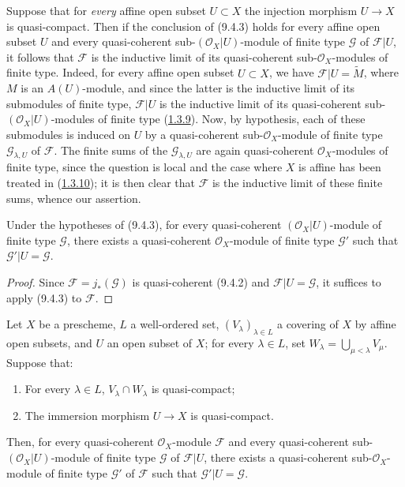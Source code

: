 \begin{remark}[9.4.4]
\label{I.9.4.4}
Suppose that for \emph{every} affine open subset $U\subset X$ the injection
morphism $U\to X$ is quasi-compact. Then if the conclusion of (9.4.3)
holds for every affine open subset $U$ and every quasi-coherent
sub-$(\mathscr{O}_X|U)$-module of finite type $\mathscr{G}$ of
$\mathscr{F}|U$,
it follows that $\mathscr{F}$ is the inductive limit of its quasi-coherent
sub-$\mathscr{O}_X$-modules of finite type. Indeed, for every affine open
subset $U\subset X$, we have $\mathscr{F}|U=\widetilde{M}$, where $M$ is an
$A(U)$-module, and since the latter is the inductive limit of its
submodules of finite type, $\mathscr{F}|U$ is the inductive limit of its
quasi-coherent sub-$(\mathscr{O}_X|U)$-modules of finite type
(\hyperref[I.1.3.9]{1.3.9}). Now, by hypothesis, each of these
submodules is induced on $U$ by a quasi-coherent sub-$\mathscr{O}_X$-module
of finite type $\mathscr{G}_{\lambda,U}$ of $\mathscr{F}$. The finite sums
of the $\mathscr{G}_{\lambda,U}$ are again quasi-coherent
$\mathscr{O}_X$-modules of finite type, since the question is local and the
case where $X$ is affine has been treated in
(\hyperref[I.1.3.10]{1.3.10}); it is then clear that $\mathscr{F}$ is the
inductive limit of these finite sums, whence our assertion.
\end{remark}

\begin{corollary}[9.4.5]
\label{I.9.4.5}
Under the hypotheses of (9.4.3), for every quasi-coherent
$(\mathscr{O}_X|U)$-module of finite type $\mathscr{G}$, there exists a
quasi-coherent $\mathscr{O}_X$-module of finite type $\mathscr{G}'$ such
that $\mathscr{G}'|U=\mathscr{G}$.
\end{corollary}

\begin{proof}
Since $\mathscr{F}=j_*(\mathscr{G})$ is quasi-coherent (9.4.2) and
$\mathscr{F}|U=\mathscr{G}$, it suffices to apply (9.4.3) to $\mathscr{F}$.
\end{proof}

\begin{lemma}[9.4.6]
\label{I.9.4.6}
Let $X$ be a prescheme, $L$ a well-ordered set,
$(V_\lambda)_{\lambda\in L}$ a covering of $X$ by affine open subsets, and
$U$ an open subset of $X$; for every $\lambda\in L$, set
$W_\lambda=\bigcup_{\mu<\lambda}V_\mu$. Suppose that:
\begin{enumerate}
  \item[\textup{1\textsuperscript{o}}] For every $\lambda\in L$,
    $V_\lambda\cap W_\lambda$ is quasi-compact;
  \item[\textup{2\textsuperscript{o}}] The immersion morphism $U\to X$ is
    quasi-compact.
\end{enumerate}
Then, for every quasi-coherent $\mathscr{O}_X$-module $\mathscr{F}$ and every
quasi-coherent sub-$(\mathscr{O}_X|U)$-module \textup{of finite type} $\mathscr{G}$ of
$\mathscr{F}|U$, there exists a quasi-coherent sub-$\mathscr{O}_X$-module \textup{of
finite type} $\mathscr{G}'$ of $\mathscr{F}$ such that
$\mathscr{G}'|U=\mathscr{G}$.
\end{lemma}

